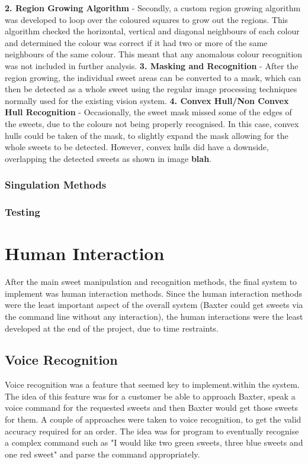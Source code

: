 \textbf{2. Region Growing Algorithm} - Secondly, a custom region growing algorithm was developed to loop over the coloured squares to grow out the regions. This algorithm checked the horizontal, vertical and diagonal neighbours of each colour and determined the colour was correct if it had two or more of the same neighbours of the same colour. This meant that any anomalous colour recognition was not included in further analysis.
\newline\newline
\textbf{3. Masking and Recognition} - After the region growing, the individual sweet areas can be converted to a mask, which can then be detected as a whole sweet using the regular image processing techniques normally used for the existing vision system.
\newline\newline
\textbf{4. Convex Hull/Non Convex Hull Recognition} - Occasionally, the sweet mask missed some of the edges of the sweets, due to the colours not being properly recognised. In this case, convex hulls could be taken of the mask, to slightly expand the mask allowing for the whole sweets to be detected. However, convex hulls did have a downside, overlapping the detected sweets as shown in image \textbf{blah}.
\subsubsection{Singulation Methods}
\subsubsection{Testing}
\section{Human Interaction}
After the main sweet manipulation and recognition methods, the final system to implement was human interaction methods. Since the human interaction methods were the least important aspect of the overall system (Baxter could get sweets via the command line without any interaction), the human interactions were the least developed at the end of the project, due to time restraints.
\subsection{Voice Recognition}
Voice recognition was a feature that seemed key to implement.within the system. The idea of this feature was for a customer be able to approach Baxter, speak a voice command for the requested sweets and then Baxter would get those sweets for them. A couple of approaches were taken to voice recognition, to get the valid accuracy required for an order. The idea was for program to eventually recognise a complex command such as "I would like two green sweets, three blue sweets and one red sweet" and parse the command appropriately.
